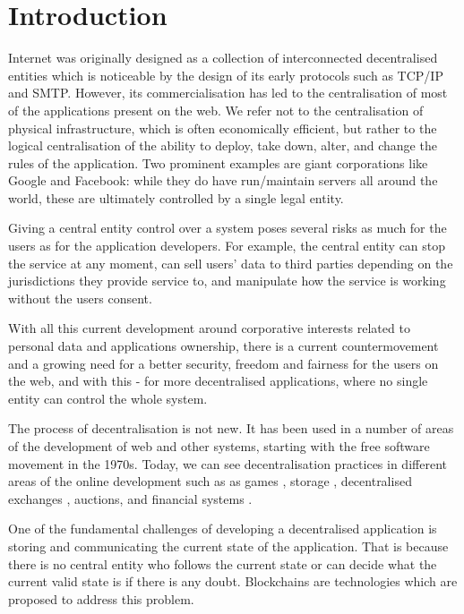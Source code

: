 \section{Introduction}\label{sec:intro}
Internet was originally designed as a collection of interconnected decentralised entities which is noticeable by the design of its early protocols such as TCP/IP and SMTP. However, its commercialisation has led to the centralisation of most of the applications present on the web. We refer not to the centralisation of physical infrastructure, which is often economically efficient, but rather to the logical centralisation of the ability to deploy, take down, alter, and change the rules of the application. Two prominent examples are giant corporations like Google and Facebook: while they do have run/maintain servers all around the world, these are ultimately controlled by a single legal entity.

Giving a central entity control over a system poses several risks as much for the users as for the application developers. For example, the central entity can stop the service at any moment, can sell users' data to third parties depending on the jurisdictions they provide service to, and manipulate how the service is working without the users consent.

With all this current development around corporative interests related to personal data and applications ownership, there is a current countermovement and a growing need for a better security, freedom and fairness for the users on the web, and with this - for more decentralised applications, where no single entity can control the whole system.
    
The process of decentralisation is not new. It has been used in a number of areas of the development of web and other systems, starting with the free software movement in the 1970s. Today, we can see decentralisation practices in different areas of the online development such as as games \cite{}, storage \cite{}, decentralised exchanges \cite{}, auctions\cite{}, and financial systems \cite{}.

One of the fundamental challenges of developing a decentralised application is storing and communicating the current state of the application. That is because there is no central entity who follows the current state or can decide what the current valid state is if there is any doubt. Blockchains are technologies which are proposed to address this problem.

